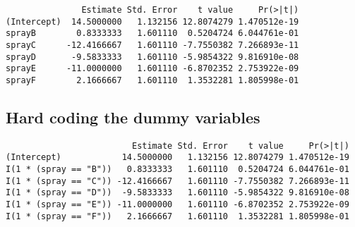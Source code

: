 \documentclass[12pt,]{04-class-files/abntex2}
\newenvironment{Shaded}{\begin{snugshade}}{\end{snugshade}}
\newcommand{\DataTypeTok}[1]{\textcolor[rgb]{0.13,0.29,0.53}{#1}}
\newcommand{\DecValTok}[1]{\textcolor[rgb]{0.00,0.00,0.81}{#1}}
\newcommand{\KeywordTok}[1]{\textcolor[rgb]{0.13,0.29,0.53}{\textbf{#1}}}
\newcommand{\NormalTok}[1]{#1}
\newcommand{\OperatorTok}[1]{\textcolor[rgb]{0.81,0.36,0.00}{\textbf{#1}}}
\newcommand{\StringTok}[1]{\textcolor[rgb]{0.31,0.60,0.02}{#1}}
\begin{document}
\begin{verbatim}
               Estimate Std. Error    t value     Pr(>|t|)
(Intercept)  14.5000000   1.132156 12.8074279 1.470512e-19
sprayB        0.8333333   1.601110  0.5204724 6.044761e-01
sprayC      -12.4166667   1.601110 -7.7550382 7.266893e-11
sprayD       -9.5833333   1.601110 -5.9854322 9.816910e-08
sprayE      -11.0000000   1.601110 -6.8702352 2.753922e-09
sprayF        2.1666667   1.601110  1.3532281 1.805998e-01
\end{verbatim}

\hypertarget{hard-coding-the-dummy-variables}{%
\subsection{Hard coding the dummy variables}\label{hard-coding-the-dummy-variables}}

\begin{Shaded}
\end{Shaded}

\begin{verbatim}
                         Estimate Std. Error    t value     Pr(>|t|)
(Intercept)            14.5000000   1.132156 12.8074279 1.470512e-19
I(1 * (spray == "B"))   0.8333333   1.601110  0.5204724 6.044761e-01
I(1 * (spray == "C")) -12.4166667   1.601110 -7.7550382 7.266893e-11
I(1 * (spray == "D"))  -9.5833333   1.601110 -5.9854322 9.816910e-08
I(1 * (spray == "E")) -11.0000000   1.601110 -6.8702352 2.753922e-09
I(1 * (spray == "F"))   2.1666667   1.601110  1.3532281 1.805998e-01
\end{verbatim}
\end{document}
